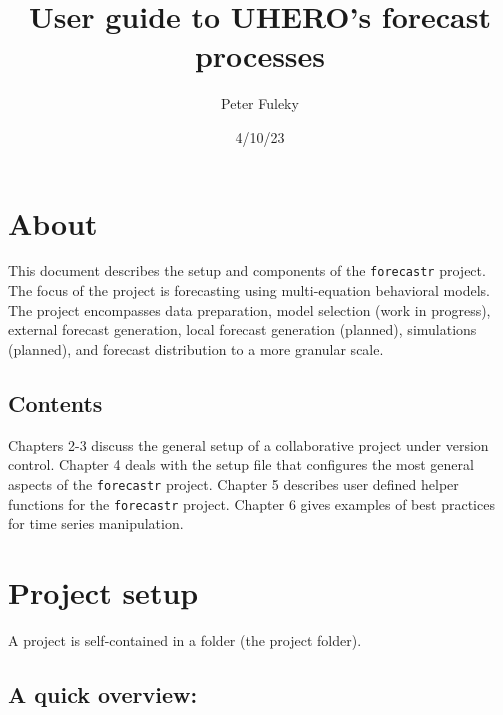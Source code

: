 \documentclass[
  letterpaper,
  DIV=11,
  numbers=noendperiod]{scrreport}
\title{User guide to UHERO's forecast processes}
\author{Peter Fuleky}
\date{4/10/23}
\renewcommand*\contentsname{Table of contents}
\newcommand\contentsname{Table of contents}
\begin{document}
\maketitle
\ifdefined\Shaded\renewenvironment{Shaded}{\begin{tcolorbox}[enhanced, boxrule=0pt, breakable, frame hidden, interior hidden, sharp corners, borderline west={3pt}{0pt}{shadecolor}]}{\end{tcolorbox}}\fi

\renewcommand*\contentsname{Table of contents}
{
\hypersetup{linkcolor=}
\setcounter{tocdepth}{2}
\tableofcontents
}

\hypertarget{about}{%
\chapter{About}\label{about}}

This document describes the setup and components of the
\texttt{forecastr} project. The focus of the project is forecasting
using multi-equation behavioral models. The project encompasses data
preparation, model selection (work in progress), external forecast
generation, local forecast generation (planned), simulations (planned),
and forecast distribution to a more granular scale.

\hypertarget{contents}{%
\section{Contents}\label{contents}}

Chapters 2-3 discuss the general setup of a collaborative project under
version control. Chapter 4 deals with the setup file that configures the
most general aspects of the \texttt{forecastr} project. Chapter 5
describes user defined helper functions for the \texttt{forecastr}
project. Chapter 6 gives examples of best practices for time series
manipulation.


\hypertarget{project-setup}{%
\chapter{Project setup}\label{project-setup}}

A project is self-contained in a folder (the project folder).

\hypertarget{a-quick-overview}{%
\section{A quick overview:}\label{a-quick-overview}}
\end{document}
